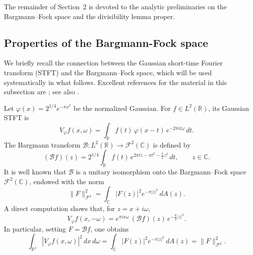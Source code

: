 \documentclass[a4paper,11pt,reqno]{amsart}
\numberwithin{equation}{section}
\theoremstyle{plain} %
\theoremstyle{definition} %
\theoremstyle{remark}
\begin{document}
The remainder of Section~2 is devoted to the analytic preliminaries on
the Bargmann--Fock space and the divisibility lemma proper.

\subsection{Properties of the Bargmann-Fock space} We briefly recall the connection between the Gaussian short-time Fourier transform
(STFT) and the Bargmann--Fock space, which will be used systematically in what
follows. Excellent references for the material in this subsection are
\cite{Bargmann,Folland,Grochenig,Zhu}; see also
\cite{Berezin,Berger-Coburn,Daubechies}.

\medskip

Let $\varphi(x) = 2^{1/4} e^{-\pi x^2}$ be the normalized Gaussian. For $f \in L^2(\mathbb{R})$, its Gaussian STFT is
\begin{equation}\label{eq:STFT}
V_\varphi f(x,\omega)
= \int_{\mathbb{R}} f(t)\, \varphi(x-t)\, e^{-2\pi i t \omega}\, dt.
\end{equation}
The Bargmann transform
$\mathcal{B} : L^2(\mathbb{R}) \to \mathcal{F}^2(\mathbb{C})$ is defined by
\begin{equation}\label{eq:Bargmann}
(\mathcal{B}f)(z)
= 2^{1/4} \int_{\mathbb{R}} f(t)\, e^{2\pi t z - \pi t^2 - \frac{\pi}{2} z^2}\, dt,
\qquad z \in \mathbb{C}.
\end{equation}
It is well known that $\mathcal{B}$ is a unitary isomorphism onto the Bargmann--Fock
space $\mathcal{F}^2(\mathbb{C})$, endowed with the norm
\[
\|F\|_{\mathcal{F}^2}^2
= \int_{\mathbb{C}} |F(z)|^2 e^{-\pi |z|^2} \, dA(z).
\]
A direct computation shows that, for $z = x + i\omega$,
\begin{equation}\label{eq:STFT-B}
V_\varphi f(x,-\omega)
= e^{\pi i x \omega}\, (\mathcal{B}f)(z)\, e^{-\frac{\pi}{2}|z|^2}.
\end{equation}
In particular, setting $F = \mathcal{B}f$, one obtains
\begin{equation}\label{eq:energy}
\int_{\mathbb{R}^2} |V_\varphi f(x,\omega)|^2 \, dx\, d\omega
= \int_{\mathbb{C}} |F(z)|^2 e^{-\pi |z|^2} \, dA(z)
= \|F\|_{\mathcal{F}^2}^2.
\end{equation}

\medskip

\noindent
\end{document}
